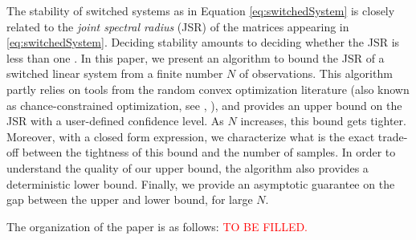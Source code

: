 The stability of switched systems as in Equation \eqref{eq:switchedSystem} is closely related to the \emph{joint spectral radius} (JSR) of the matrices appearing in \eqref{eq:switchedSystem}. Deciding stability amounts to deciding whether the JSR is less than one \cite{jungersBook}. In this paper, we present an algorithm to bound the JSR of a switched linear system from a finite number $N$ of observations. This algorithm partly relies on tools from the random convex optimization literature (also known as chance-constrained optimization, see \cite{campi} \cite{nemirovski}, \cite{campi-garatti}), and provides an upper bound on the JSR with a user-defined confidence level. As $N$ increases, this bound gets tighter. Moreover, with a closed form expression, we characterize what is the exact trade-off between the tightness of this bound and the number of samples. In order to understand the quality of our upper bound, the algorithm also provides a deterministic lower bound. Finally, we provide an asymptotic guarantee on the gap between the upper and lower bound, for large $N$.

The organization of the paper is as follows: \textcolor{red}{TO BE FILLED.}





